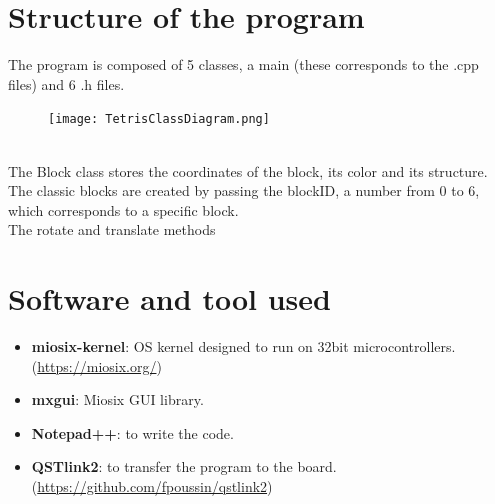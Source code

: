 \documentclass[18pt,oneside,a4paper, titlepage]{article}
\begin{document}
\section{Structure of the program}
	The program is composed of 5 classes, a main (these corresponds to the .cpp files) and 6 .h files.\\
	\vspace{0.5cm}
	\begin{figure}[h]
		\centering
		\texttt{[image: TetrisClassDiagram.png]}
	\end{figure}
	\vspace{0.5cm}
	\\
	The Block class stores the coordinates of the block, its color and its structure. The classic blocks are created by passing the blockID, a number from 0 to 6, which corresponds to a specific block.\\
	The rotate and translate methods
	
	
\newpage
\section{Software and tool used}
	\begin{itemize}
		\item \textbf{miosix-kernel}: OS kernel designed to run on 32bit microcontrollers. (\url{https://miosix.org/})
		\item \textbf{mxgui}: Miosix GUI library.
		\item \textbf{Notepad++}: to write the code.
		\item \textbf{QSTlink2}: to transfer the program to the board. (\url{https://github.com/fpoussin/qstlink2})
	\end{itemize}
\end{document}
